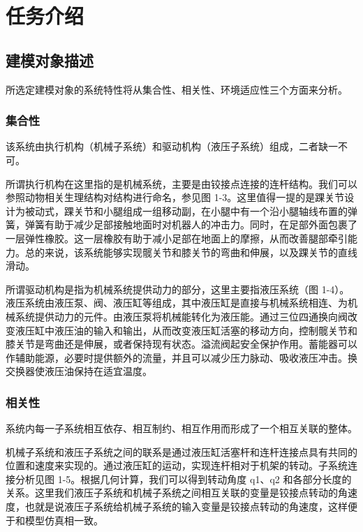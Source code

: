 
\section{任务介绍}

\subsection{建模对象描述}

所选定建模对象的系统特性将从集合性、相关性、环境适应性三个方面来分析。

\subsubsection{集合性}

该系统由执行机构（机械子系统）和驱动机构（液压子系统）组成，二者缺一不可。
 
所谓执行机构在这里指的是机械系统，主要是由铰接点连接的连杆结构。我们可以参照动物相关生理结构对结构进行命名，参见图 1-3。这里值得一提的是踝关节设计为被动式，踝关节和小腿组成一组移动副，在小腿中有一个沿小腿轴线布置的弹簧，弹簧有助于减少足部接触地面时对机器人的冲击力。同时，在足部外面包裹了一层弹性橡胶。这一层橡胶有助于减小足部在地面上的摩擦，从而改善腿部牵引能力。总的来说，该系统能够实现髋关节和膝关节的弯曲和伸展，以及踝关节的直线滑动。 

所谓驱动机构是指为机械系统提供动力的部分，这里主要指液压系统（图 1-4）。液压系统由液压泵、阀、液压缸等组成，其中液压缸是直接与机械系统相连、为机械系统提供动力的元件。由液压泵将机械能转化为液压能。通过三位四通换向阀改变液压缸中液压油的输入和输出，从而改变液压缸活塞的移动方向，控制髋关节和膝关节是弯曲还是伸展，或者保持现有状态。溢流阀起安全保护作用。蓄能器可以作辅助能源，必要时提供额外的流量，并且可以减少压力脉动、吸收液压冲击。换交换器使液压油保持在适宜温度。

\subsubsection{相关性}

系统内每一子系统相互依存、相互制约、相互作用而形成了一个相互关联的整体。

机械子系统和液压子系统之间的联系是通过液压缸活塞杆和连杆连接点具有共同的位置和速度来实现的。通过液压缸的运动，实现连杆相对于机架的转动。子系统连接分析见图 1-5。根据几何计算，我们可以得到转动角度 q1、q2 和各部分长度的关系。这里我们液压子系统和机械子系统之间相互关联的变量是铰接点转动的角速度，也就是说液压子系统给机械子系统的输入变量是铰接点转动的角速度，这样便于和模型仿真相一致。 

